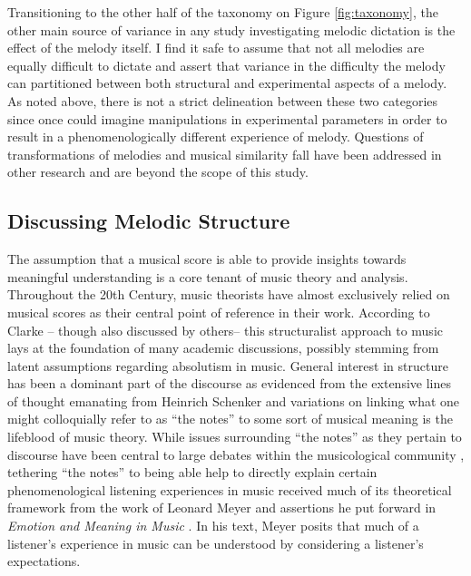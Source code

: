 \documentclass[]{book}
\begin{document}
Transitioning to the other half of the taxonomy on Figure \ref{fig:taxonomy}, the other main source of variance in any study investigating melodic dictation is the effect of the melody itself.
I find it safe to assume that not all melodies are equally difficult to dictate and assert that variance in the difficulty the melody can partitioned between both structural and experimental aspects of a melody.
As noted above, there is not a strict delineation between these two categories since once could imagine manipulations in experimental parameters in order to result in a phenomenologically different experience of melody.
Questions of transformations of melodies and musical similarity fall have been addressed in other research \citep{cambouropoulosHowSimilarSimilar2009, wigginsModelsMusicalSimilarity2007} and are beyond the scope of this study.

\hypertarget{discussing-melodic-structure}{%
\subsection{Discussing Melodic Structure}\label{discussing-melodic-structure}}

The assumption that a musical score is able to provide insights towards meaningful understanding is a core tenant of music theory and analysis.
Throughout the 20th Century, music theorists have almost exclusively relied on musical scores as their central point of reference in their work.
According to Clarke \citep{clarkeWaysListeningEcological2005}-- though also discussed by others-- this structuralist approach to music lays at the foundation of many academic discussions, possibly stemming from latent assumptions regarding absolutism in music.
General interest in structure has been a dominant part of the discourse as evidenced from the extensive lines of thought emanating from Heinrich Schenker \citep{schenkerFreieSatz1935, salzerStructuralHearingTonal1982, schachterSchenkerStudies2006, schenkerSchenkerStudies1990} and variations on linking what one might colloquially refer to as ``the notes'' to some sort of musical meaning is the lifeblood of music theory.
While issues surrounding ``the notes'' as they pertain to discourse have been central to large debates within the musicological community \citep{agawuHowWeGot2004, kermanContemplatingMusicChallenges1986}, tethering ``the notes'' to being able help to directly explain certain phenomenological listening experiences in music received much of its theoretical framework from the work of Leonard Meyer and assertions he put forward in \emph{Emotion and Meaning in Music} \citep{meyerEmotionMeaningMusic1956}.
In his text, Meyer posits that much of a listener's experience in music can be understood by considering a listener's expectations.
\end{document}
